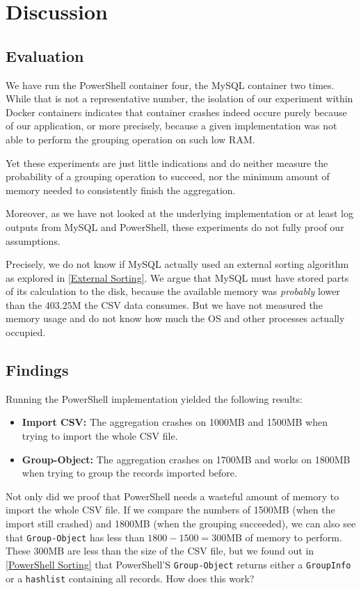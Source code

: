\newpage

\section{Discussion}

\subsection{Evaluation} \label{Evaluation}

We have run the \gls{PowerShell} container four, the \gls{MySQL} container two times.
While that is not a representative number, the isolation of our experiment
within \gls{Docker} containers indicates that container crashes indeed occure
purely because of our application, or more precisely, because a given implementation
was not able to perform the grouping operation on such low \gls{RAM}.

Yet these experiments are just little indications and do neither measure
the probability of a grouping operation to succeed, nor the minimum amount
of memory needed to consistently finish the aggregation.

Moreover, as we have not looked at the underlying implementation or at least log
outputs from \gls{MySQL} and \gls{PowerShell}, these experiments do not fully proof our assumptions.

Precisely, we do not know if \gls{MySQL} actually used an external sorting algorithm
as explored in \ref{External Sorting}. We argue that \gls{MySQL} must have stored parts
of its calculation to the disk, because the available memory was \textit{probably}
lower than the $403.25$M the \gls{CSV} data consumes. But we have not measured
the memory usage and do not know how much the \gls{OS} and other processes actually occupied.

\subsection{Findings}

Running the \gls{PowerShell} implementation yielded the following results:

\begin{itemize}
    \item \textbf{Import CSV:} The aggregation crashes on 1000MB and 1500MB when
        trying to import the whole \gls{CSV} file.

    \item \textbf{Group-Object:} The aggregation crashes on 1700MB and works on 1800MB
    when trying to group the records imported before.
\end{itemize}
Not only did we proof that \gls{PowerShell} needs a wasteful amount of memory to
import the whole \gls{CSV} file. If we compare the numbers of 1500MB (when the import
still crashed) and 1800MB (when the grouping succeeded), we can also see that
\verb+Group-Object+ has less than $1800-1500=300$MB of memory to perform.
These 300MB are less than the size of the \gls{CSV} file, but we found out
in \ref{PowerShell Sorting} that \gls{PowerShell}'S \verb+Group-Object+
returns either a \verb+GroupInfo+ or a \verb+hashlist+ containing all records.
How does this work?

